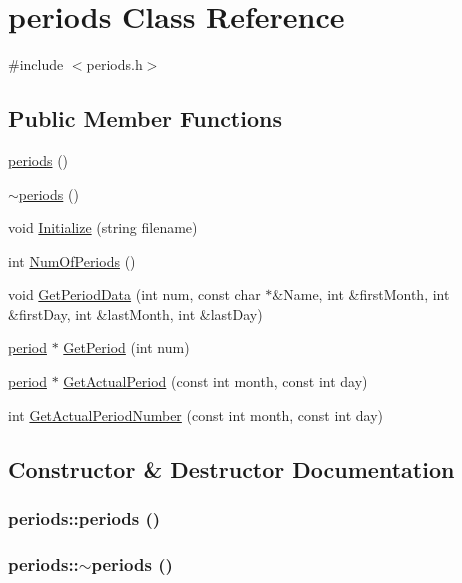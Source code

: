\hypertarget{classperiods}{
\section{periods Class Reference}
\label{classperiods}
}


{\ttfamily \#include $<$periods.h$>$}\subsection*{Public Member Functions}
\begin{DoxyCompactItemize}
\item 
\hyperlink{classperiods_aeb243ff66524b7a0a2fc5026af59bfef}{periods} ()
\item 
\hyperlink{classperiods_a17b34121cc51b6332f8e89b7063ef565}{$\sim$periods} ()
\item 
void \hyperlink{classperiods_ae425558a335cbc501737abe59f2869b2}{Initialize} (string filename)
\item 
int \hyperlink{classperiods_a2b04396ded0beb2aa694d70de7900ca7}{NumOfPeriods} ()
\item 
void \hyperlink{classperiods_a5e4c803ff5ed191628246ca1bed7ef13}{GetPeriodData} (int num, const char $\ast$\&Name, int \&firstMonth, int \&firstDay, int \&lastMonth, int \&lastDay)
\item 
\hyperlink{classperiod}{period} $\ast$ \hyperlink{classperiods_a0e9206e33b8b0caa791477048170fd1d}{GetPeriod} (int num)
\item 
\hyperlink{classperiod}{period} $\ast$ \hyperlink{classperiods_a7d603035820b13950719ffff6af8f9c2}{GetActualPeriod} (const int month, const int day)
\item 
int \hyperlink{classperiods_a44361b4f807693968fcc1c5b70c015d6}{GetActualPeriodNumber} (const int month, const int day)
\end{DoxyCompactItemize}


\subsection{Constructor \& Destructor Documentation}
\hypertarget{classperiods_aeb243ff66524b7a0a2fc5026af59bfef}{
\subsubsection[{periods}]{\setlength{\rightskip}{0pt plus 5cm}periods::periods ()}}
\label{classperiods_aeb243ff66524b7a0a2fc5026af59bfef}
\hypertarget{classperiods_a17b34121cc51b6332f8e89b7063ef565}{
\subsubsection[{$\sim$periods}]{\setlength{\rightskip}{0pt plus 5cm}periods::$\sim$periods ()}}
\label{classperiods_a17b34121cc51b6332f8e89b7063ef565}


